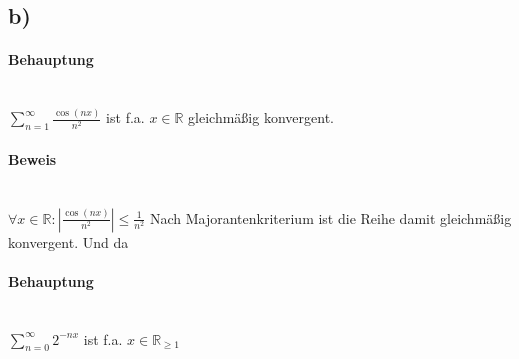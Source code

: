 \subsection*{b)}

\paragraph*{Behauptung} ~\\
$ \sum\limits_{n=1}^\infty \frac{\cos(nx)}{n^{2}} $ ist f.a. $x \in \mathbb{R}$ gleichmäßig konvergent.

\paragraph*{Beweis} ~\\
$ \forall x \in \mathbb{R} : |\frac{\cos(nx)}{n^{2}}| \leq \frac{1}{n^{2}} $
Nach Majorantenkriterium ist die Reihe damit gleichmäßig konvergent.
Und da 

\paragraph*{Behauptung} ~\\
$ \sum\limits_{n=0}^\infty 2^{-nx}$ ist f.a. $x \in \mathbb{R}_{\geq 1}$

